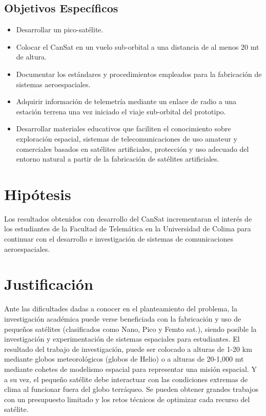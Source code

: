 \subsection{Objetivos Espec\'{i}ficos}
\begin{itemize}
\item Desarrollar un pico-sat\'{e}lite.
\item Colocar el CanSat en un vuelo sub-orbital a una distancia de al menos 20 mt de altura.
\item Documentar los est\'{a}ndares y procedimientos empleados para la fabricaci\'{o}n de sistemas aeroespaciales.
\item Adquirir informaci\'{o}n de telemetr\'{i}a mediante un enlace de radio a una estaci\'{o}n terrena una vez iniciado el viaje sub-orbital del prototipo.
\item Desarrollar materiales educativos que faciliten el conocimiento sobre exploraci\'{o}n espacial, sistemas de telecomunicaciones de uso amateur y comerciales basados en sat\'{e}lites artificiales, protecci\'{o}n y uso adecuado del entorno natural a partir de la fabricaci\'{o}n de sat\'{e}lites artificiales. 
\end{itemize}

\section{Hip\'{o}tesis}
Los resultados obtenidos con desarrollo del CanSat incrementaran el inter\'{e}s de los estudiantes de la Facultad de Telem\'{a}tica en la Universidad de Colima para continuar con el desarrollo e investigaci\'{o}n de sistemas de comunicaciones aeroespaciales.

\section{Justificaci\'{o}n}
Ante las dificultades dadas a conocer en el planteamiento del problema, la investigaci\'{o}n acad\'{e}mica puede verse beneficiada con la fabricaci\'{o}n y uso de peque\~{n}os sat\'{e}lites (clasificados como Nano, Pico y Femto sat.), siendo posible la investigaci\'{o}n y experimentaci\'{o}n de sistemas espaciales para estudiantes. El resultado del trabajo de investigaci\'{o}n, puede ser colocado a alturas de 1-20 km  mediante globos meteorol\'{o}gicos (globos de Helio) o a alturas de 20-1,000 mt mediante cohetes de modelismo espacial para representar una misi\'{o}n espacial.  Y a su vez, el peque\~{n}o sat\'{e}lite debe interactuar con las condiciones extremas de clima al funcionar fuera del globo terr\'{a}queo. 
Se pueden obtener grandes trabajos con un presupuesto limitado y los retos t\'{e}cnicos de optimizar cada recurso del sat\'{e}lite.


